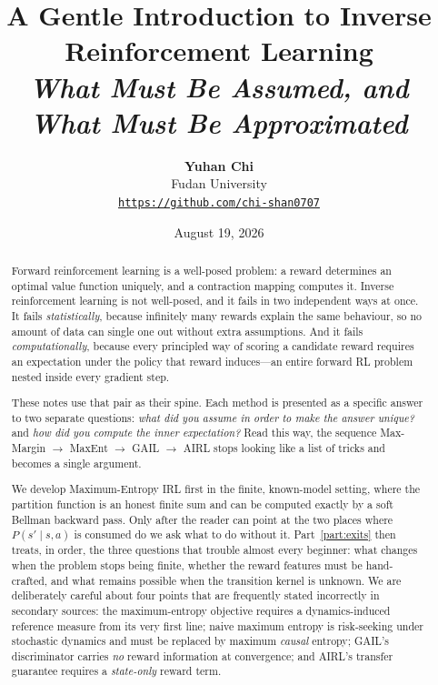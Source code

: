 \documentclass[11pt]{article}
\title{\vspace{-1.5em}\textbf{A Gentle Introduction to Inverse Reinforcement
Learning}\\[0.3em]
\large\textit{What Must Be Assumed, and What Must Be Approximated}}
\author{\textbf{Yuhan Chi}\\[0.2em]\normalsize Fudan University\\[0.2em]
\href{https://github.com/chi-shan0707}{\texttt{https://github.com/chi-shan0707}}}
\date{August 19, 2026}
\theoremstyle{plain}
\theoremstyle{definition}
\theoremstyle{remark}
\begin{document}
\maketitle
\thispagestyle{empty}

\begin{abstract}
\noindent
Forward reinforcement learning is a well-posed problem: a reward determines
an optimal value function uniquely, and a contraction mapping computes it.
Inverse reinforcement learning is not well-posed, and it fails in two
independent ways at once. It fails \emph{statistically}, because infinitely
many rewards explain the same behaviour, so no amount of data can single one
out without extra assumptions. And it fails \emph{computationally}, because
every principled way of scoring a candidate reward requires an expectation
under the policy that reward induces---an entire forward RL problem nested
inside every gradient step.

These notes use that pair as their spine. Each method is presented as a
specific answer to two separate questions: \emph{what did you assume in
order to make the answer unique?} and \emph{how did you compute the inner
expectation?} Read this way, the sequence Max-Margin $\to$ MaxEnt $\to$ GAIL
$\to$ AIRL stops looking like a list of tricks and becomes a single
argument.

We develop Maximum-Entropy IRL first in the finite, known-model setting,
where the partition function is an honest finite sum and can be computed
exactly by a soft Bellman backward pass. Only after the reader can point at
the two places where $P(s' \mid s,a)$ is consumed do we ask what to do
without it. Part~\ref{part:exits} then treats, in order, the three
questions that trouble almost every beginner: what changes when the problem
stops being finite, whether the reward features must be hand-crafted, and
what remains possible when the transition kernel is unknown. We are
deliberately careful about four points that are frequently stated
incorrectly in secondary sources: the maximum-entropy objective requires a
dynamics-induced reference measure from its very first line; naive maximum
entropy is risk-seeking under stochastic dynamics and must be replaced by
maximum \emph{causal} entropy; GAIL's discriminator carries \emph{no} reward
information at convergence; and AIRL's transfer guarantee requires a
\emph{state-only} reward term.
\end{abstract}

\tableofcontents

\clearpage
\end{document}
